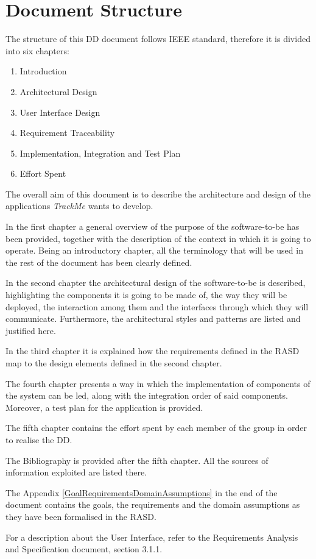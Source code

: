 \section{Document Structure}
    The structure of this DD document follows IEEE standard, therefore it is divided into six chapters:
    \begin{enumerate}
        \item Introduction
        
        \item Architectural Design
        
        \item User Interface Design
        
        \item Requirement Traceability
        
        \item Implementation, Integration and Test Plan
        
        \item Effort Spent
    \end{enumerate}
    
The overall aim of this document is to describe the architecture and design of the applications \emph{TrackMe} wants to develop.
    
    In the first chapter a general overview of the purpose of the software-to-be has been provided, together with the description of the context in which it is going to operate. Being an introductory chapter, all the terminology that will be used in the rest of the document has been clearly defined.
    
    In the second chapter the architectural design of the software-to-be is described, highlighting the components it is going to be made of, the way they will be deployed, the interaction among them and the interfaces through which they will communicate. Furthermore, the architectural styles and patterns are listed and justified here.
    
    In the third chapter it is explained how the requirements defined in the RASD map to the design elements defined in the second chapter.
    
    The fourth chapter presents a way in which the implementation of components of the system can be led, along with the integration order of said components. Moreover, a test plan for the application is provided.
    
    The fifth chapter contains the effort spent by each member of the group in order to realise the DD.
    
    The Bibliography is provided after the fifth chapter. All the sources of information exploited are listed there.
    
    The Appendix \ref{GoalRequirementsDomainAssumptions} in the end of the document contains the goals, the requirements and the domain assumptions as they have been formalised in the RASD.
    
    For a description about the User Interface, refer to the Requirements Analysis and Specification document, section 3.1.1.
    
    